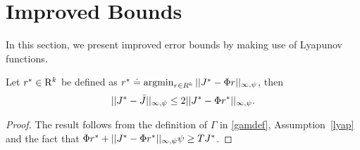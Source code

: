 \section{Improved Bounds}\label{sec:improv}
In this section, we present improved error bounds by making use of Lyapunov functions. 
\begin{lemma}\label{bestbndmn}
Let $r^*\in \mathrm{R}^k$ be defined as $r^*\doteq\operatorname{argmin}_{r\in R^k}||J^*-\Phi r||_{\infty,\psi}$, then 
\begin{align}
||J^*-\bar{J}||_{\infty,\psi}\leq 2||J^*-\Phi r^*||_{\infty,\psi}.
\end{align}
\end{lemma}
\begin{proof}
The result follows from the definition of $\Gamma$ in \eqref{gamdef}, Assumption~\ref{lyap} and the fact that $\Phi r^*+||J^*-\Phi r^*||_{\infty,\psi} \psi\geq TJ^*$.
\end{proof}

